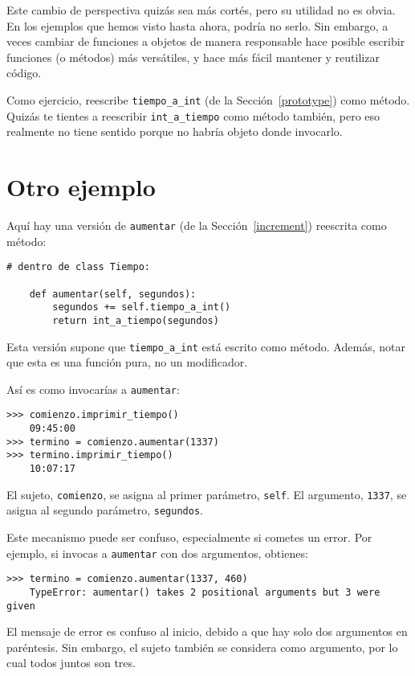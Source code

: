 \documentclass[10pt]{book}
\begin{document}
Este cambio de perspectiva quizás sea más cortés, pero su utilidad
no es obvia.  En los ejemplos que hemos visto hasta ahora, podría no
serlo.  Sin embargo, a veces cambiar de funciones a objetos de manera
responsable hace posible escribir funciones (o métodos) más versátiles,
y hace más fácil mantener y reutilizar código.

Como ejercicio, reescribe \verb"tiempo_a_int" (de la
Sección~\ref{prototype}) como método.  Quizás te tientes a
reescribir \verb"int_a_tiempo" como método también, pero eso realmente
no tiene sentido porque no habría objeto donde
invocarlo.


\section{Otro ejemplo}

Aquí hay una versión de {\tt aumentar} (de la Sección~\ref{increment})
reescrita como método:

\begin{verbatim}
# dentro de class Tiempo:

    def aumentar(self, segundos):
        segundos += self.tiempo_a_int()
        return int_a_tiempo(segundos)
\end{verbatim}
%
Esta versión supone que \verb"tiempo_a_int" está escrito
como método.  Además, notar que
esta es una función pura, no un modificador.

Así es como invocarías a {\tt aumentar}:

\begin{verbatim}
>>> comienzo.imprimir_tiempo()
    09:45:00
>>> termino = comienzo.aumentar(1337)
>>> termino.imprimir_tiempo()
    10:07:17
\end{verbatim}
%
El sujeto, {\tt comienzo}, se asigna al primer parámetro,
{\tt self}.  El argumento, {\tt 1337}, se asigna al
segundo parámetro, {\tt segundos}.

Este mecanismo puede ser confuso, especialmente si cometes un error.
Por ejemplo, si invocas a {\tt aumentar} con dos argumentos,
obtienes:

\begin{verbatim}
>>> termino = comienzo.aumentar(1337, 460)
    TypeError: aumentar() takes 2 positional arguments but 3 were given
\end{verbatim}
%
El mensaje de error es confuso al inicio, debido a que hay
solo dos argumentos en paréntesis.  Sin embargo, el sujeto también
se considera como argumento, por lo cual todos juntos son tres.
\end{document}

